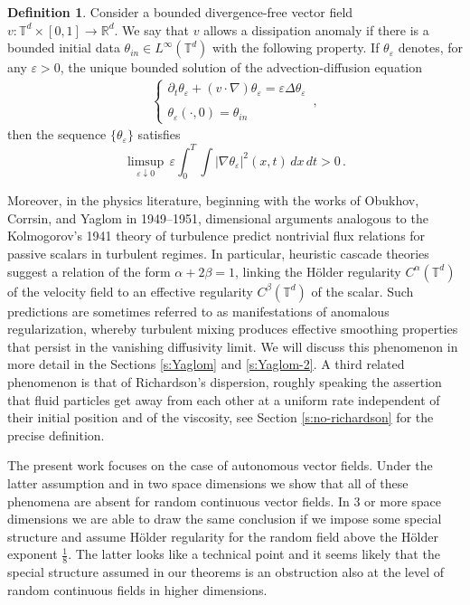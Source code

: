 \documentclass[11pt,reqno]{amsart}
\theoremstyle{definition}
\newtheorem{definition}[theorem]{Definition}
\numberwithin{equation}{section}
\begin{document}
\begin{definition}\label{d:anomalous-dissipation}
Consider a bounded divergence-free vector field $v : \mathbb{T}^d \times [0,1] \rightarrow \mathbb{R}^d$. We say that $v$ allows a dissipation anomaly if there is a bounded initial data $\theta_{in} \in L^\infty (\mathbb{T}^d)$ with the following property. If $\theta_\varepsilon$ denotes, for any $\varepsilon>0$, the unique bounded solution of the advection-diffusion equation
\begin{align}\label{e:parabolic}
\left\{
\begin{array}{ll}
\partial_t \theta_\varepsilon + (v\cdot \nabla) \theta_\varepsilon = \varepsilon \Delta \theta_\varepsilon\\ \\
\theta_\varepsilon (\cdot, 0) = \theta_{in}
\end{array}
\right.\, ,
\end{align}
then the sequence $\{ \theta_\varepsilon \}$ satisfies
\[
\limsup_{\varepsilon \downarrow 0}\,  \varepsilon \int_0^T \int |\nabla \theta_\varepsilon|^2 (x,t)\, dx \, dt > 0\, .
\]
\end{definition}

Moreover, in the physics literature, beginning with the works of Obukhov, Corrsin, and Yaglom \cite{Obukhov1949,Corrsin1951,Yaglom1949} in 1949--1951, dimensional arguments analogous to the Kolmogorov's 1941 theory of turbulence predict nontrivial flux relations for passive scalars in turbulent regimes. In particular, heuristic cascade theories suggest a relation of the form $\alpha + 2\beta = 1$,
linking the H\"older regularity $C^\alpha (\mathbb{T}^d)$ of the velocity field to an effective regularity $C^\beta (\mathbb{T}^d)$ of the scalar. Such predictions are sometimes referred to as manifestations of anomalous regularization, whereby turbulent mixing produces effective smoothing properties that persist in the vanishing diffusivity limit. We will discuss this phenomenon in more detail in the Sections \ref{s:Yaglom} and \ref{s:Yaglom-2}. A third related phenomenon is that of Richardson's dispersion, roughly speaking the assertion that fluid particles get away from each other at a uniform rate independent of their initial position and of the viscosity, see Section \ref{s:no-richardson} for the precise definition.

\medskip

The present work focuses on the case of autonomous vector fields. Under the latter assumption and in two space dimensions we show that all of these phenomena are absent for random continuous vector fields. In $3$ or more space dimensions we are able to draw the same conclusion if we impose some special structure and assume H\"older regularity for the random field above the H\"older exponent $\frac{1}{8}$. The latter looks like a technical point and it seems likely that the special structure assumed in our theorems is an obstruction also at the level of random continuous fields in higher dimensions. 
\end{document}
